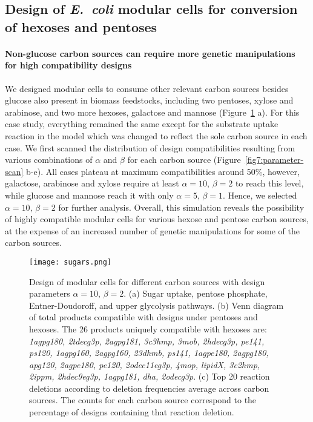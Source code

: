 {\subsection{Design of \textit{E.~coli} modular cells for conversion of hexoses and pentoses}
\paragraph{Non-glucose carbon sources can require more genetic manipulations for high compatibility designs}
We designed modular cells to consume other relevant carbon sources besides glucose also present in biomass feedstocks, including two pentoses, xylose and arabinose, and two more hexoses, galactose and mannose (Figure~\ref{fig7:sugars} a).
For this case study, everything remained the same except for the substrate uptake reaction in the model which was changed to reflect the sole carbon source in each case.
We first scanned the distribution of design compatibilities resulting from various combinations of $\alpha$ and $\beta$ for each carbon source (Figure~\ref{fig7:parameter-scan} b-e).
All cases plateau at maximum compatibilities around 50\%, however, galactose, arabinose and xylose require at least $\alpha=10, \, \beta=2$ to reach this level, while glucose and mannose reach it with only $\alpha=5, \, \beta=1$.
Hence, we selected $\alpha=10, \, \beta=2$ for further analysis.
Overall, this simulation reveals the possibility of highly compatible modular cells for various hexose and pentose carbon sources, at the expense of an increased number of genetic manipulations for some of the carbon sources.

\begin{figure}[htp]
    \centering
    \texttt{[image: sugars.png]}
    \caption[Design of modular cells for different carbon sources]{Design of modular cells for different carbon sources with design parameters $\alpha=10, \, \beta=2$. (a) Sugar uptake, pentose phosphate, Entner-Doudoroff, and upper glycolysis pathways. (b) Venn diagram of total products compatible with designs under pentoses and hexoses.
    The 26 products uniquely compatible with hexoses are:
    \textit{1agpg180, 2tdecg3p, 2agpg181, 3c3hmp, 3mob, 2hdecg3p, pe141, ps120, 1agpg160, 2agpg160, 23dhmb, ps141, 1agpe180, 2agpg180, apg120, 2agpe180, pe120, 2odec11eg3p, 4mop, lipidX, 3c2hmp, 2ippm, 2hdec9eg3p, 1agpg181, dha, 2odecg3p}.
    (c) Top 20 reaction deletions according to deletion frequencies average across carbon sources. The counts for each carbon source correspond to the percentage of designs containing that reaction deletion.}
    \label{fig7:sugars}
\end{figure}


}
